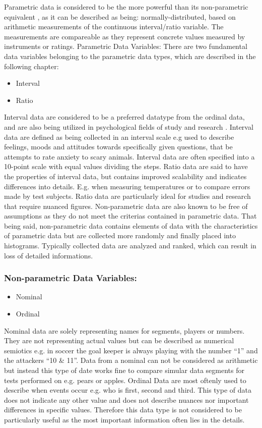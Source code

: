 Parametric data is considered to be the more powerful than its non-parametric equivalent \citep[page 21]{Design}, as it can be described as being: normally-distributed, based on arithmetic measurements of the continuous interval/ratio variable. The measurements are compareable as they represent concrete values measured by instruments or ratings.
Parametric Data Variables:
There are two fundamental data variables belonging to the parametric data types, which are described in the following chapter:
\begin{itemize}
\item Interval
\item Ratio 
\end{itemize}
Interval data are considered to be a preferred datatype from the ordinal data, and are also being utilized in psychological fields of study and research \citep[page 8]{Design}. Interval data are defined as being collected in an interval scale e.g used to describe feelings, moods and attitudes towards specifically given questions, that be attempts to rate anxiety to scary animals. Interval data are often specified into a 10-point scale with equal values dividing the steps.
Ratio data are said to have the properties of interval data, but contains improved scalability and indicates differences into details. E.g. when measuring temperatures or to compare errors made by test subjects. Ratio data are particularly ideal for studies and research that require nuanced figures.
Non-parametric data are also known to be free of assumptions as they do not meet the criterias contained in parametric data. That being said, non-parametric data contains elements of data with the characteristics of parametric data but are collected more randomly and finally placed into histograms. Typically collected data are analyzed and ranked, which can result in loss of detailed informations. 
\subsubsection{Non-parametric Data Variables:}
\begin{itemize}
\item Nominal
\item Ordinal
\end{itemize}
Nominal data are solely representing names for segments, players or numbers. They are not representing actual values but can be described as numerical semiotics e.g. in soccer the goal keeper is always playing with the number “1” and the attackers “10 \& 11”. Data from a nominal can not be considered as arithmetic but instead this type of date works fine to compare simular data segments for tests performed on e.g. pears or apples.
Ordinal Data are most oftenly used to describe when events occur e.g. who is first, second and third. This type of data does not indicate any other value and does not describe nuances nor important differences in specific values. Therefore this data type is not considered to be particularly useful as the most important information often lies in the details. 
